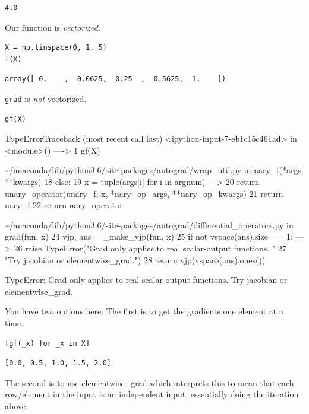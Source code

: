 \documentclass[11pt]{article}
\begin{document}
\begin{verbatim}
4.0
\end{verbatim}

Our function is \emph{vectorized}.

\begin{verbatim}
X = np.linspace(0, 1, 5)
f(X)
\end{verbatim}

\begin{verbatim}
array([ 0.    ,  0.0625,  0.25  ,  0.5625,  1.    ])
\end{verbatim}

\texttt{grad} is \emph{not} vectorized.

\begin{verbatim}
gf(X)
\end{verbatim}

TypeErrorTraceback (most recent call last)
<ipython-input-7-eb1c15c461ad> in <module>()
----> 1 gf(X)

\textasciitilde{}/anaconda/lib/python3.6/site-packages/autograd/wrap\_util.py in nary\_f(*args, **kwargs)
     18             else:
     19                 x = tuple(args[i] for i in argnum)
---> 20             return unary\_operator(unary\_f, x, *nary\_op\_args, **nary\_op\_kwargs)
     21         return nary\_f
     22     return nary\_operator

\textasciitilde{}/anaconda/lib/python3.6/site-packages/autograd/differential\_operators.py in grad(fun, x)
     24     vjp, ans = \_make\_vjp(fun, x)
     25     if not vspace(ans).size == 1:
---> 26         raise TypeError("Grad only applies to real scalar-output functions. "
     27                         "Try jacobian or elementwise\_grad.")
     28     return vjp(vspace(ans).ones())

TypeError: Grad only applies to real scalar-output functions. Try jacobian or elementwise\_grad.

You have two options here. The first is to get the gradients one element at a time.

\begin{verbatim}
[gf(_x) for _x in X]
\end{verbatim}

\begin{verbatim}
[0.0, 0.5, 1.0, 1.5, 2.0]
\end{verbatim}

The second is to use elementwise\_grad which interprets this to mean that each row/element in the input is an independent input, essentially doing the iteration above.
\end{document}

